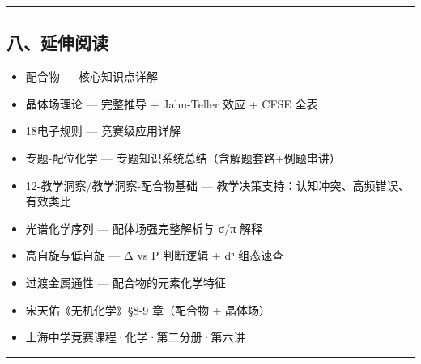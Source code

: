 \documentclass[a4paper,11pt]{ctexart}
\providecommand{\tightlist}{\setlength{\itemsep}{0pt}\setlength{\parskip}{0pt}}
\begin{document}
\begin{center}\rule{0.5\linewidth}{0.5pt}\end{center}

\subsection{八、延伸阅读}\label{ux516bux5ef6ux4f38ux9605ux8bfb}

\begin{itemize}
\tightlist
\item
  配合物 --- 核心知识点详解
\item
  晶体场理论 --- 完整推导 + Jahn-Teller 效应 + CFSE 全表
\item
  18电子规则 --- 竞赛级应用详解
\item
  专题-配位化学 --- 专题知识系统总结（含解题套路+例题串讲）
\item
  12-教学洞察/教学洞察-配合物基础 --- 教学决策支持：认知冲突、高频错误、有效类比
\item
  光谱化学序列 --- 配体场强完整解析与 σ/π 解释
\item
  高自旋与低自旋 --- Δ vs P 判断逻辑 + dⁿ 组态速查
\item
  过渡金属通性 --- 配合物的元素化学特征
\item
  宋天佑《无机化学》§8-9 章（配合物 + 晶体场）
\item
  上海中学竞赛课程·化学·第二分册·第六讲
\end{itemize}

\begin{center}\rule{0.5\linewidth}{0.5pt}\end{center}
\end{document}
